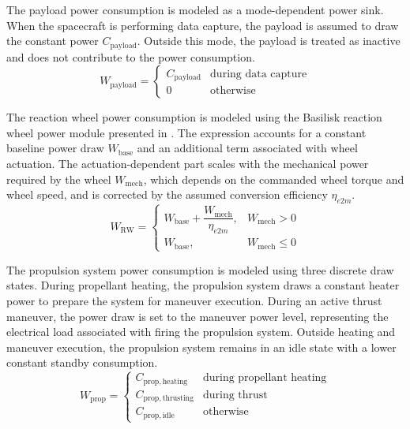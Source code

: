 The payload power consumption is modeled as a mode-dependent power sink. When the spacecraft is performing data capture, the payload is assumed to draw the constant power $C_{\mathrm{payload}}$. Outside this mode, the payload is treated as inactive and does not contribute to the power consumption.
\begin{equation}
    W_{\mathrm{payload}} = \begin{cases}
        C_{\mathrm{payload}} & \text{during data capture}\\
        0 \quad & \text{otherwise}
    \end{cases} 
\end{equation}


The reaction wheel power consumption is modeled using the Basilisk reaction wheel power module presented in \cite{basiliskRWpower}. The expression accounts for a constant baseline power draw $W_{\mathrm{base}}$ and an additional term associated with wheel actuation. The actuation-dependent part scales with the mechanical power required by the wheel $W_{\mathrm{mech}}$, which depends on the commanded wheel torque and wheel speed, and is corrected by the assumed conversion efficiency $\eta_{e2m}$.
\begin{equation}
W_{\mathrm{RW}} = \begin{cases}
    W_{\mathrm{base}} + \dfrac{W_{\mathrm{mech}}}{\eta_{e2m}}, & W_{\mathrm{mech}} > 0 \\[6pt]
    W_{\mathrm{base}}, & W_{\mathrm{mech}} \leq 0
    \end{cases}   
\end{equation}


The propulsion system power consumption is modeled using three discrete draw states. During propellant heating, the propulsion system draws a constant heater power to prepare the system for maneuver execution. During an active thrust maneuver, the power draw is set to the maneuver power level, representing the electrical load associated with firing the propulsion system. Outside heating and maneuver execution, the propulsion system remains in an idle state with a lower constant standby consumption.
\begin{equation}
    W_{\mathrm{prop}} = \begin{cases}
        C_{\mathrm{prop,heating}} & \text{during propellant heating}\\
        C_{\mathrm{prop,thrusting}} & \text{during thrust}\\
        C_{\mathrm{prop,idle}} \quad & \text{otherwise}
    \end{cases} 
\end{equation}


